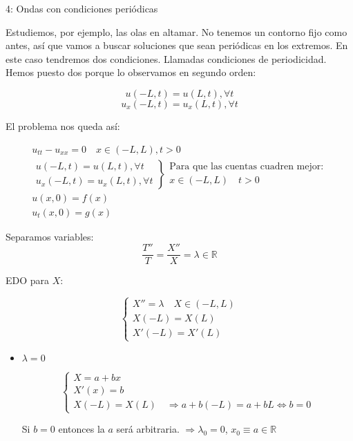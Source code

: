 		\begin{example}{4: Ondas con condiciones periódicas}

			Estudiemos, por ejemplo, las olas en altamar. No tenemos un contorno fijo como antes, así que vamos a buscar soluciones que sean periódicas en los extremos. En este caso tendremos dos condiciones. Llamadas condiciones de periodicidad. Hemos puesto dos porque lo observamos en segundo orden:

			\[u(-L,t) = u(L,t), \forall t\]
			\[u_x(-L,t) = u_x(L,t), \forall t\]

			El problema nos queda así:

			\[  \begin{array}{l}
				u_{tt} - u_{xx} = 0 \quad x  \in (-L,L), t>0\\
				\left. \begin{array}{l}
				u(-L,t) = u(L,t), \forall t\\
				u_x(-L,t) = u_x(L,t), \forall t
				\end{array} \right\} \begin{array}{l}
					\text{Para que las cuentas cuadren mejor:}  \\
					x \in (-L,L) \quad t > 0
				\end{array}\\
				u(x,0) = f(x) \\
				u_t(x,0) = g(x)
				\end{array}
			\]

			Separamos variables:
			\[ \frac{T''}{T} = \frac{X''}{X} = \lambda \in \mathbb{R}\]

			EDO para $X$:

			\[\left\{\begin{array}{l}
				X'' = \lambda \quad X \in (-L,L) \\
				X(-L) = X(L) \\
				X'(-L) = X'(L)
			\end{array}
			\right. \]

			\begin{itemize}
				\item $\lambda = 0$

					\[\left\{\begin{array}{l}
						X = a+bx \\
						X'(x) = b \\
						X(-L) = X(L) \quad \Rightarrow a + b(-L) = a + bL \Leftrightarrow b = 0
					\end{array}
					\right. \]

					Si $b = 0$ entonces la $a$ será arbitraria. $\Rightarrow \lambda_0 = 0$, $ x_0 \equiv a \in \mathbb{R}$



\end{itemize}
\end{example}
